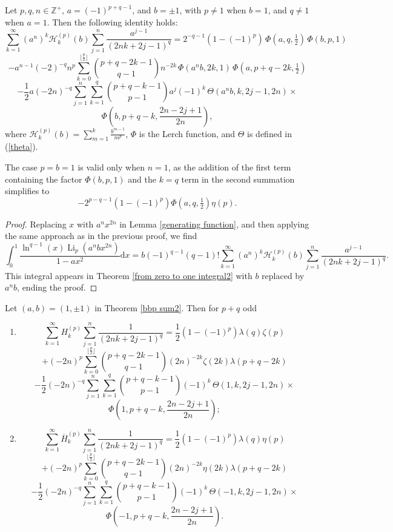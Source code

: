 \documentclass[11pt,reqno]{article}
\begin{document}
\begin{theorem}\label{bbp sum2}
	Let $p,q,n\in\mathbb{Z}^{+}$, $a={(-1)}^{p+q-1}$, and $b=\pm1$, with $p\ne1$ when $b=1$, and $q\neq1$ when $a=1$. Then the following identity holds:
	\[\sum_{k=1}^\infty {(a^n)}^{k} \mathcal{H}_k^{(p)}(b)\sum_{j=1}^{n}\frac{a^{j-1}}{(2nk+2j-1)^q}= 2^{-q-1}(1-{(-1)}^{p})\,\Phi(a,q,\tfrac12)\,\Phi(b,p,1)\]
	\[-a^{n-1} (-2)^{-q} n^{p}\sum_{k=0}^{\lfloor\frac{p}{2}\rfloor}\binom{p+q-2k-1}{q-1}n^{-2k}\,\Phi(a^nb,2k,1)\,\Phi(a,p+q-2k,\tfrac{1}{2})\]
	\[-\frac12 a {(-2n)}^{-q}\sum_{j=1}^{n}\sum_{k=1}^{q}\binom{p+q-k-1}{p-1}a^j{(-1)}^{k}\,\Theta(a^nb,k,2j-1,2n)\times\]
	\[\Phi\left(b,p+q-k,\frac{2n-2j+1}{2n}\right),\]	
	where $\mathcal{H}_k^{(p)}(b)=\sum_{m=1}^{k}\frac{b^{m-1}}{m^p}$, $\Phi$ is the Lerch function, and $\Theta$ is defined in (\ref{theta}). 
\end{theorem}
\begin{remark}
	The case $p=b=1$ is valid only when $n=1$, as the addition of the first term containing the factor $\Phi(b,p,1)$ and the $k=q$ term in the second summation simplifies to \[-2^{p-q-1}(1-{(-1)}^{p})\Phi(a,q,\tfrac12)\eta(p).\]
\end{remark}
\begin{proof} Replacing $x$ with $a^n x^{2n}$ in Lemma \ref{generating function}, and then applying the same approach as in the previous proof, we find
	\[\int_0^1\frac{\ln^{q-1}(x)\operatorname{Li}_{p}(a^nb x^{2n})}{1-ax^2}\mathrm{d} x=b{(-1)}^{q-1}(q-1)!\sum_{k=1}^\infty {(a^n)}^{k} \mathcal{H}_k^{(p)}(b)\sum_{j=1}^{n}\frac{a^{j-1}}{(2nk+2j-1)^q}.\]
	This integral appears in Theorem \ref{from zero to one integral2} with $b$ replaced by $a^nb$, ending the proof.
\end{proof}

\begin{corollary}
	Let $(a,b)=(1,\pm1)$ in Theorem \ref{bbp sum2}. Then for $p+q$ odd
	\begin{enumerate}
		\item[i)]
		\[\sum_{k=1}^\infty  H_k^{(p)}\sum_{j=1}^{n}\frac{1}{(2nk+2j-1)^q}=\frac12(1-{(-1)}^{p})\lambda(q)\zeta(p)\]
		\[+{(-2n)}^{p}\sum_{k=0}^{\lfloor\frac{p}{2}\rfloor}\binom{p+q-2k-1}{q-1}{(2n)}^{-2k}\zeta(2k)\lambda(p+q-2k)\]
		\[-\frac12 {(-2n)}^{-q}\sum_{j=1}^{n}\sum_{k=1}^{q}\binom{p+q-k-1}{p-1}{(-1)}^{k}\,\Theta(1,k,2j-1,2n)\times\]
		\[\Phi\left(1,p+q-k,\frac{2n-2j+1}{2n}\right);\]
		\item[ii)]
		\[\sum_{k=1}^\infty  \overline{H}_k^{(p)}\sum_{j=1}^{n}\frac{1}{(2nk+2j-1)^q}=\frac12(1-{(-1)}^{p})\lambda(q)\eta(p)\]
		\[+{(-2n)}^{p}\sum_{k=0}^{\lfloor\frac{p}{2}\rfloor}\binom{p+q-2k-1}{q-1}{(2n)}^{-2k}\eta(2k)\lambda(p+q-2k)\]
		\[-\frac12 {(-2n)}^{-q}\sum_{j=1}^{n}\sum_{k=1}^{q}\binom{p+q-k-1}{p-1}{(-1)}^{k}\,\Theta(-1,k,2j-1,2n)\times\]
		\[\Phi\left(-1,p+q-k,\frac{2n-2j+1}{2n}\right).\]
	\end{enumerate}
\end{corollary}
\end{document}
